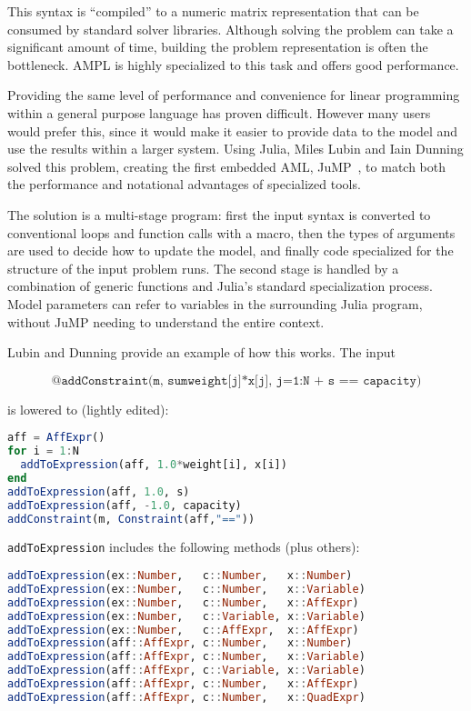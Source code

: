 \noindent
This syntax is ``compiled'' to a numeric matrix representation that can
be consumed by standard solver libraries.
Although solving the problem can take a significant amount of time,
building the problem representation is often the bottleneck.
AMPL is highly specialized to this task and offers good performance.

Providing the same level of performance and convenience for linear programming
within a general purpose language has proven difficult.
However many users would prefer this, since it would make it easier to
provide data to the model and use the results within a larger system.
Using Julia, Miles Lubin and Iain Dunning solved this problem, creating the
first embedded AML, JuMP~\cite{LubinDunningIJOC}, to match both the performance
and notational advantages of specialized tools.

The solution is a multi-stage program: first the input syntax is converted to
conventional loops and function calls with a macro, then the types of
arguments are used to decide how to update the model, and finally code
specialized for the structure of the input problem runs.
The second stage is handled by a combination of generic functions and
Julia's standard specialization process.
Model parameters can refer to variables in the surrounding Julia program,
without JuMP needing to understand the entire context.

Lubin and Dunning provide an example of how this works.
The input

\vspace{-3ex}
\[ \texttt{@addConstraint(m, sum{weight[j]*x[j], j=1:N} + s == capacity)} \]

\noindent
is lowered to (lightly edited):

\begin{singlespace}
\begin{lstlisting}[language=julia]
aff = AffExpr()
for i = 1:N
  addToExpression(aff, 1.0*weight[i], x[i])
end
addToExpression(aff, 1.0, s)
addToExpression(aff, -1.0, capacity)
addConstraint(m, Constraint(aff,"=="))
\end{lstlisting}
\end{singlespace}

\noindent
\texttt{addToExpression} includes the following methods (plus others):

\begin{singlespace}
\begin{lstlisting}[language=julia]
addToExpression(ex::Number,   c::Number,   x::Number)
addToExpression(ex::Number,   c::Number,   x::Variable)
addToExpression(ex::Number,   c::Number,   x::AffExpr)
addToExpression(ex::Number,   c::Variable, x::Variable)
addToExpression(ex::Number,   c::AffExpr,  x::AffExpr)
addToExpression(aff::AffExpr, c::Number,   x::Number)
addToExpression(aff::AffExpr, c::Number,   x::Variable)
addToExpression(aff::AffExpr, c::Variable, x::Variable)
addToExpression(aff::AffExpr, c::Number,   x::AffExpr)
addToExpression(aff::AffExpr, c::Number,   x::QuadExpr)
\end{lstlisting}
\end{singlespace}

